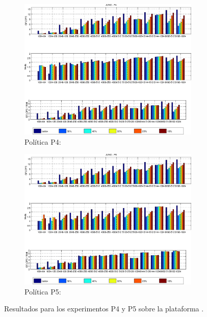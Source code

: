 \begin{figure}
  \centering
    \begin{subfigure}{0.82\textwidth}
      \centering
      \caption*{Política P4:}
      \includegraphics[width=0.95\textwidth]{Plots/sched_results/P4_juno.eps}
    \end{subfigure}

    \vspace{1cm}

    \begin{subfigure}{0.82\textwidth}
      \centering
      \caption*{Política P5:}
      \includegraphics[width=0.95\textwidth]{Plots/sched_results/P5_juno.eps}

    \end{subfigure}  
  \caption{Resultados para los experimentos P4 y P5 sobre la plataforma
    \juno.}
  \label{fig:p4-p5}
\end{figure}


